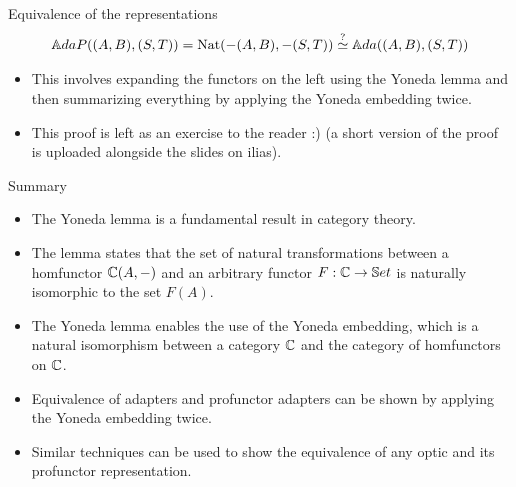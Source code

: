 \fi
\begin{frame}{Equivalence of the representations}
	\begin{align*}
		\mathbb{A}daP ((A,B),(S,T)) = \text{Nat}(-(A, B), -(S, T)) \overset{?}{\simeq} {\mathbb{A}da}((A,B), (S,T))
	\end{align*}
	\begin{itemize}
		\pause\item This involves expanding the functors on the left using the Yoneda lemma and then summarizing everything by applying the Yoneda embedding twice.
		\pause\item This proof is left as an exercise to the reader :) \pause(a short version of the proof is uploaded alongside the slides on ilias).
	\end{itemize}
\end{frame}
\begin{frame}{Summary}
	\begin{itemize}
		\item The Yoneda lemma is a fundamental result in category theory.
		\pause\item The lemma states that the set of natural transformations between a homfunctor $\mathbb{C}(A, -)$ and an arbitrary functor $F : \mathbb{C} \to \mathbb{S}et$ is naturally isomorphic to the set $F(A)$.
		\pause\item The Yoneda lemma enables the use of the Yoneda embedding, which is a natural isomorphism between a category $\mathbb{C}$ and the category of homfunctors on $\mathbb{C}$.
		\pause\item Equivalence of adapters and profunctor adapters can be shown by applying the Yoneda embedding twice.
		\pause\item Similar techniques can be used to show the equivalence of any optic and its profunctor representation.
	\end{itemize}
\end{frame}
